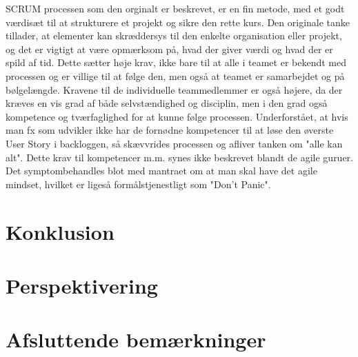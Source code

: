 SCRUM processen som den orginalt er beskrevet, er en fin metode, med et godt værdisæt til at strukturere et projekt og sikre den rette kurs.
Den originale tanke tillader, at elementer kan skræddersys til den enkelte organisation eller projekt, og det er vigtigt at være opmærksom på, hvad der giver værdi og hvad der er spild af tid.
Dette sætter høje krav, ikke bare til at alle i teamet er bekendt med processen og er villige til at følge den, men også at teamet er samarbejdet og på bølgelængde.
Kravene til de individuelle teammedlemmer er også højere, da der kræves en vis grad af både selvstændighed og disciplin, men i den grad også kompetence og tværfaglighed for at kunne følge processen.
Underforstået, at hvis man fx som udvikler ikke har de fornødne kompetencer til at løse den øverste User Story i backloggen, så skævvrides processen og afliver tanken om "alle kan alt". 
Dette krav til kompetencer m.m. synes ikke beskrevet blandt de agile guruer. Det symptombehandles blot med mantraet om at man skal have det agile mindset, hvilket er ligeså formålstjenestligt som "Don't Panic".

\section{Konklusion}
\label{sec:conclusion_conclusion}

\section{Perspektivering}
\label{sec:conclusion_perspective}

\section{Afsluttende bemærkninger}
\label{sec:conclusion_remarks}

